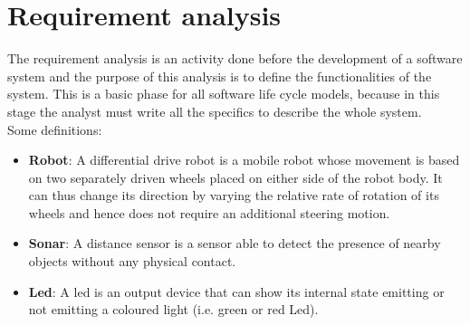 \section{Requirement analysis}
The requirement analysis is an activity done before the development of a software system and the purpose of this analysis is to define the functionalities of the system. This is a basic phase for all software life cycle models, because in this stage the analyst must write all the specifics to describe the whole system. \\
Some definitions:
\begin{itemize}
	\item \textbf{Robot}: A differential drive robot is a mobile robot whose movement is based on two separately driven wheels placed on either side of the robot body. It can thus change its direction by varying the relative rate of rotation of its wheels and hence does not require an additional steering motion.
	\item \textbf{Sonar}: A distance sensor is a sensor able to detect the presence of nearby objects without any physical contact.
	\item \textbf{Led}: A led is an output device that can show its internal state emitting or not emitting a coloured light (i.e. green or red Led).
\end{itemize}




